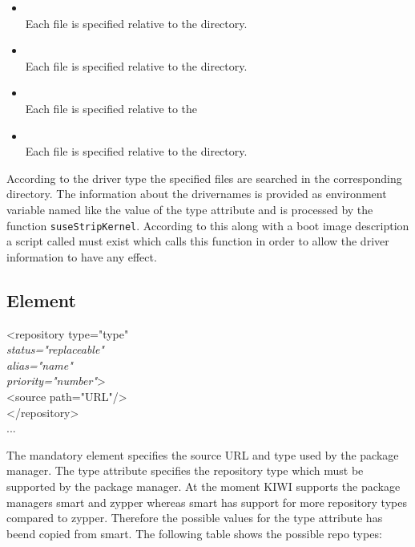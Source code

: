 \begin{itemize}
\item {}\\
      Each file is specified relative to the
       directory.
\item {}\\
      Each file is specified relative to the
      directory.
\item {}\\
      Each file is specified relative to the
\item {}\\
      Each file is specified relative to the
       directory.
\end{itemize}

According to the driver type the specified files are searched in
the corresponding directory. The information about the drivernames
is provided as environment variable named like the value of
the type attribute and is processed by the function
\texttt{suseStripKernel}. According to this along with a boot image
description a script called  must exist which
calls this function in order to allow the driver information to
have any effect.


\subsection{ Element}
\begin{Command}{12cm}
<repository type="type"\\
\hspace*{1cm}\textit{status="replaceable"}\\
\hspace*{1cm}\textit{alias="name"}\\
\hspace*{1cm}\textit{priority="number"}>\\
\hspace*{2cm}<source path="URL"/>\\
</repository>\\
...
\end{Command}

The mandatory  element specifies the source URL and
type used by the package manager. The type attribute specifies the
repository type which must be supported by the package manager.
At the moment KIWI supports the package managers smart and zypper
whereas smart has support for more repository types compared to
zypper. Therefore the possible values for the type attribute has
beend copied from smart. The following table shows the possible
repo types:\\ 

